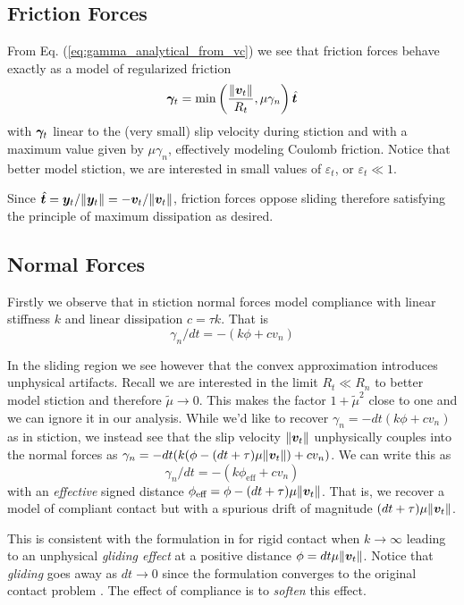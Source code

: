 \subsection{Friction Forces}
From Eq. (\ref{eq:gamma_analytical_from_vc}) we see that friction forces behave exactly as a
model of regularized friction
\begin{equation}
	{\bm\gamma}_t = \min\left(\frac{\Vert{\bm{v}}_t\Vert}{R_t}, \mu\gamma_n\right)\hat{{\bm{t}}}
\end{equation}
with ${\bm\gamma}_t$ linear to the (very small) slip velocity during stiction and
with a maximum value given by $\mu\gamma_n$, effectively modeling Coulomb
friction. Notice that better model stiction, we are interested in small values
of $\varepsilon_t$, or $\varepsilon_t\ll 1$.

Since $\hat{{\bm{t}}} = {\bm{y}}_t/\Vert{\bm{y}}_t\Vert =
-{\bm{v}}_t/\Vert{\bm{v}}_t\Vert$, friction forces oppose sliding therefore
satisfying the principle of maximum dissipation as desired.

\subsection{Normal Forces}
Firstly we observe that in stiction normal forces model compliance with linear
stiffness $k$ and linear dissipation $c = \tau k$. That is
\begin{equation}
    \gamma_n/dt = -(k\phi + c v_n)
\end{equation}

In the sliding region we see however that the convex approximation introduces
unphysical artifacts. Recall we are interested in the limit $R_t \ll R_n$ to
better model stiction and therefore $\tilde\mu \rightarrow 0$. This makes the
factor $1+\tilde{\mu}^2$ close to one and we can ignore it in our analysis.
While we'd like to recover $\gamma_n = -dt(k\phi + c v_n)$ as in stiction, we
instead see that the slip velocity $\Vert{\bm{v}}_t\Vert$ unphysically couples
into the normal forces as $\gamma_n=-dt(k(\phi-(dt+\tau)\mu\Vert{\bm{v}}_t\Vert) +
cv_n)$. We can write this as
\begin{equation}
  \gamma_n/dt=-(k\phi_\text{eff} + c v_n)
\end{equation}
with an \textit{effective} signed distance $\phi_\text{eff} =
\phi-(dt+\tau)\mu\Vert{\bm{v}}_t\Vert$. That is, we recover a model of compliant
contact but with a spurious drift of magnitude $(dt+\tau)\mu\Vert{\bm{v}}_t\Vert$.

This is consistent with the formulation in \cite{bib:anitescu2010} for rigid
contact when $k\rightarrow \infty$ leading to an unphysical \textit{gliding
effect} at a positive distance $\phi=dt\mu\Vert{\bm{v}}_t\Vert$. Notice that
\textit{gliding} goes away as $dt\rightarrow 0$ since the formulation converges
to the original contact problem \cite{bib:anitescu2006}. The effect of
compliance is to \textit{soften} this effect. 

